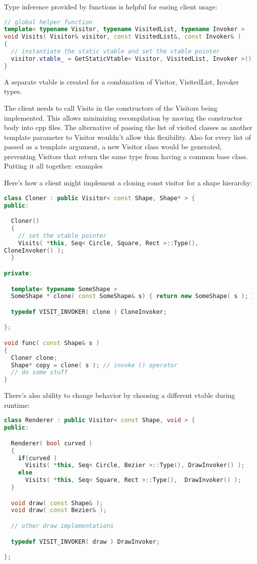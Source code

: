 \documentclass{book}
\begin{document}
Type inference provided by functions is helpful for easing client usage:

\begin{lstlisting}[caption={visitor pattern sample code 5, commandexample.cpp},language=C++]
// global helper function
template< typename Visitor, typename VisitedList, typename Invoker >
void Visits( Visitor& visitor, const VisitedList&, const Invoker& )
{
  // instantiate the static vtable and set the vtable pointer
  visitor.vtable_ = GetStaticVtable< Visitor, VisitedList, Invoker >();
}
\end{lstlisting}

A separate vtable is created for a combination of Visitor, VisitedList, Invoker types.

The client needs to call Visits in the constructors of the Visitors being implemented. This allows minimizing recompilation by moving the constructor body into cpp files.
The alternative of passing the list of visited classes as another template parameter to Visitor wouldn't allow this flexibility.
Also for every list of passed as a template argument, a new Visitor class would be generated, preventing Visitors that return the same type from having a common base class.
Putting it all together: examples

Here's how a client might implement a cloning const visitor for a shape hierarchy:

\begin{lstlisting}[caption={visitor pattern sample code 5, commandexample.cpp},language=C++]
class Cloner : public Visitor< const Shape, Shape* > {
public:

  Cloner()
  {
    // set the vtable pointer
    Visits( *this, Seq< Circle, Square, Rect >::Type(), 
CloneInvoker() );
  }

private:

  template< typename SomeShape >
  SomeShape * clone( const SomeShape& s) { return new SomeShape( s ); }

  typedef VISIT_INVOKER( clone ) CloneInvoker;

}; 

void func( const Shape& s )
{
  Cloner clone;
  Shape* copy = clone( s ); // invoke () operator
  // do some stuff
}
\end{lstlisting}

There's also ability to change behavior by choosing a different vtable during runtime:

\begin{lstlisting}[caption={visitor pattern sample code 5, commandexample.cpp},language=C++]
class Renderer : public Visitor< const Shape, void > {
public:

  Renderer( bool curved )
  {
    if(curved )
      Visits( *this, Seq< Circle, Bezier >::Type(), DrawInvoker() );
    else
      Visits( *this, Seq< Square, Rect >::Type(),  DrawInvoker() );
  }

  void draw( const Shape& );
  void draw( const Bezier& );

  // other draw implementations

  typedef VISIT_INVOKER( draw ) DrawInvoker;

};
\end{lstlisting}
\end{document}
